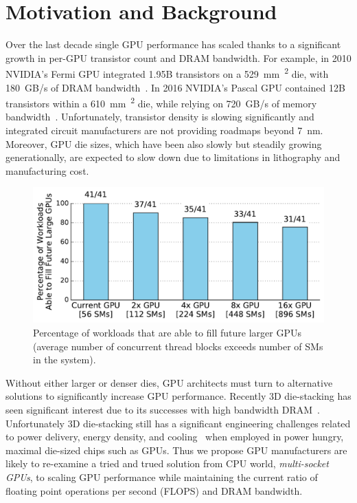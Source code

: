 \section{Motivation and Background}
\label{sec:background}

Over the last decade single GPU performance has scaled thanks to a 
significant growth in per-GPU transistor count and DRAM bandwidth. For 
example, in 2010 NVIDIA's Fermi GPU integrated 1.95B transistors on a 
\SI{529}{mm\textsuperscript{2}} die, with \SI{180}{GB/s} of DRAM 
bandwidth~\cite{hennessypatterson11}. In 2016 NVIDIA's Pascal GPU 
contained 12B transistors within a \SI{610}{mm\textsuperscript{2}} die, while 
relying on \SI{720}{GB/s} of memory bandwidth~\cite{inside-pascal}. Unfortunately, 
transistor density is slowing significantly and integrated circuit 
manufacturers are not providing roadmaps beyond \SI{7}{nm}. Moreover, GPU die sizes,
which have been also slowly but steadily growing generationally, are 
expected to slow down due to limitations in lithography and manufacturing cost.

\begin{figure}[t] 
    \centering
    \includegraphics[width=1.0\columnwidth]{figures/plot_ctas_per_sm.pdf}
    \caption{Percentage of workloads that are able to fill future larger GPUs 
    (average number of concurrent thread blocks exceeds number of SMs in the system).}
    \label{fig:ctas}
\end{figure}

Without either larger or denser dies, GPU architects must turn to 
alternative solutions to significantly increase GPU performance.  Recently 3D 
die-stacking has seen significant interest due to its successes with high 
bandwidth DRAM~\cite{HBM}. Unfortunately 3D die-stacking still has 
a significant engineering challenges related to power delivery, 
energy density, and cooling~\cite{verbree2010cost} when employed in power 
hungry, maximal die-sized chips such as GPUs. Thus we propose GPU manufacturers 
are likely to re-examine a tried and trued solution from CPU world, 
\textit{multi-socket GPUs}, to scaling GPU performance while maintaining the 
current ratio of floating point operations per second (FLOPS) and DRAM 
bandwidth.

